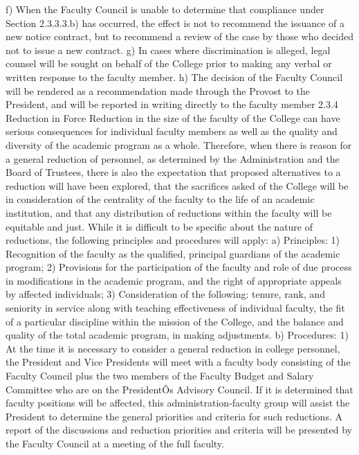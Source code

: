 \documentclass[letterpaper, 11pt]{article}
\begin{document}
f) When the Faculty Council is unable to determine that compliance under Section 2.3.3.3.b) has occurred, the effect is not to recommend the issuance of a new notice contract, but to recommend a review of the case by those who decided not to issue a new contract.
g) In cases where discrimination is alleged, legal counsel will be sought on behalf of the College prior to making any verbal or written response to the faculty member.
h) The decision of the Faculty Council will be rendered as a recommendation made through the Provost to the President, and will be reported in writing directly to the faculty member
2.3.4 Reduction in Force
   Reduction in the size of the faculty of the College can have serious consequences for individual faculty members as well as the quality and diversity of the academic program as a whole.  Therefore, when there is reason for a general reduction of personnel, as determined by the Administration and the Board of Trustees, there is also the expectation that proposed alternatives to a reduction will have been explored, that the sacrifices asked of the College will be in consideration of the centrality of the faculty to the life of an academic institution, and that any distribution of reductions within the faculty will be equitable and just.  While it is difficult to be specific about the nature of reductions, the following principles and procedures will apply:
a) Principles:
1) Recognition of the faculty as the qualified, principal guardians of the academic program;
2) Provisions for the participation of the faculty and role of due process in modifications in the academic program, and the right of appropriate appeals by affected individuals;
3) Consideration of the following: tenure, rank, and seniority in service along with teaching effectiveness of individual faculty, the fit of a particular discipline within the mission of the College, and the balance and quality of the total academic program, in making adjustments.
b) Procedures:
1) At the time it is necessary to consider a general reduction in college personnel, the President and Vice Presidents will meet with a faculty body consisting of the Faculty Council plus the two members of the Faculty Budget and Salary Committee who are on the PresidentÕs Advisory Council.  If it is determined that faculty positions will be affected, this administration-faculty group will assist the President to determine the general priorities and criteria for such reductions. A report of the discussions and reduction priorities and criteria will be presented by the Faculty Council at a meeting of the full faculty.
\end{document}
